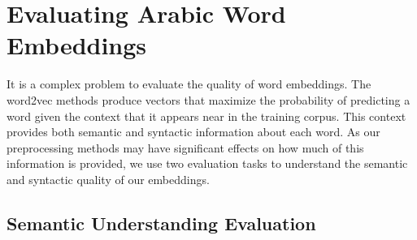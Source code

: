 \section{Evaluating Arabic Word Embeddings}

It is a complex problem to evaluate the quality of word embeddings. The word2vec methods produce vectors that maximize the probability of predicting a word given the context that it appears near in the training corpus. This context provides both semantic and syntactic information about each word. As our preprocessing methods may have significant effects on how much of this information is provided, we use two evaluation tasks to understand the semantic and syntactic quality of our embeddings.

\subsection{Semantic Understanding Evaluation}

